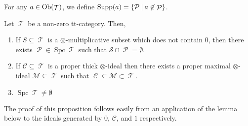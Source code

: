 \documentclass[11pt]{article}
\DeclareMathOperator{\CC}{\mathcal{C}}
\DeclareMathOperator{\TT}{\mathcal{T}}
\DeclareMathOperator{\cP}{\mathcal{P}}
\DeclareMathOperator{\spc}{Spc}
\begin{document}
\begin{defn}
For any $a \in \Ob(\TT)$, we define $\Supp(a) = \{\mathcal{P}\:|\: a \not\in \cP\}$.
\end{defn}

\begin{prop}
Let $\TT$ be a non-zero tt-category. Then, 
\begin{enumerate}[1.]
\item If $S \subseteq \TT$ is a $\otimes$-multiplicative subset which does not contain $0$, then there exists $\cP \in \spc \TT$ such that $\mathcal{S} \cap \cP = \emptyset$.
\item If $\mathcal{C} \subseteq \TT$ is a proper thick $\otimes$-ideal then there exists a proper maximal $\otimes$-ideal $\mathcal{M} \subseteq \TT$ such that $\CC \subseteq \mathcal{M} \subset \TT$.
	\item $\spc \TT \not = \emptyset$
\end{enumerate}
\end{prop}

The proof of this proposition follows easily from an application of the lemma below to the ideals generated by $0$, $\mathcal{C}$, and $1$ respectively.
\end{document}
